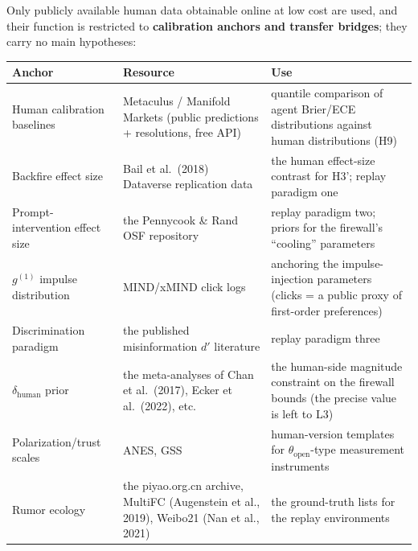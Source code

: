 \documentclass[
  11pt]{article}
\begin{document}
Only publicly available human data obtainable online at low cost are
used, and their function is restricted to \textbf{calibration anchors
and transfer bridges}; they carry no main hypotheses:

\begin{longtable}[]{@{}
  >{\raggedright\arraybackslash}p{}
  >{\raggedright\arraybackslash}p{}
  >{\raggedright\arraybackslash}p{}@{}}
\toprule\noalign{}
\begin{minipage}[b]{\linewidth}\raggedright
Anchor
\end{minipage} & \begin{minipage}[b]{\linewidth}\raggedright
Resource
\end{minipage} & \begin{minipage}[b]{\linewidth}\raggedright
Use
\end{minipage} \\
\midrule\noalign{}
\endhead
\bottomrule\noalign{}
\endlastfoot
Human calibration baselines & Metaculus / Manifold Markets (public
predictions + resolutions, free API) & quantile comparison of agent
Brier/ECE distributions against human distributions (H9) \\
Backfire effect size & Bail et al.~(2018) Dataverse replication data &
the human effect-size contrast for H3'; replay paradigm one \\
Prompt-intervention effect size & the Pennycook \& Rand OSF repository &
replay paradigm two; priors for the firewall's ``cooling'' parameters \\
\(g^{(1)}\) impulse distribution & MIND/xMIND click logs & anchoring the
impulse-injection parameters (clicks = a public proxy of first-order
preferences) \\
Discrimination paradigm & the published misinformation \(d'\) literature
& replay paradigm three \\
\(\delta_{\mathrm{human}}\) prior & the meta-analyses of Chan et
al.~(2017), Ecker et al.~(2022), etc. & the human-side magnitude
constraint on the firewall bounds (the precise value is left to L3) \\
Polarization/trust scales & ANES, GSS & human-version templates for
\(\theta_{\mathrm{open}}\)-type measurement instruments \\
Rumor ecology & the piyao.org.cn archive, MultiFC (Augenstein et al.,
2019), Weibo21 (Nan et al., 2021) & the ground-truth lists for the
replay environments \\
\end{longtable}
\end{document}
